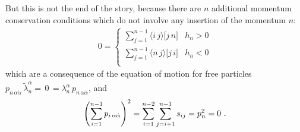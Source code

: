 \documentclass[aps,prd,nofootinbib,twocolumn,10pt]{revtex4-2}
\newcommand{\agl}[2]{\langle#1\, #2 \rangle}
\newcommand{\sqr}[2]{\lbrack #1\, #2 \rbrack}
\newcommand{\tlambda}{\widetilde{\lambda}}
\begin{document}
But this is not the end of the story, because there are $n$ additional momentum conservation conditions which do not involve any insertion of the momentum $n$:
\begin{align}
\label{eq::momcons2}
    0 = 
    \begin{cases}
        \sum\limits_{j=1}^{n-1} \agl{i}{j} \sqr{j}{n} &  h_n>0\\[.5em]
        \sum\limits_{j=1}^{n-1} \agl{n}{j} \sqr{j}{i} &  h_n<0\\
    \end{cases}
\end{align}
which are a consequence of the equation of motion for free particles $p_{n\, \alpha \dot{\alpha}}\, \tlambda_{n}^{\dot{\alpha}}=\, 0 \, = \lambda^{\alpha}_n\, p_{n\, \alpha \dot{\alpha}}$, and
\begin{equation}
\label{eq::momcons1}
	\left(\sum_{i = 1}^{n-1} p_{i \, \alpha \dot{\alpha}}\right)^2 =\sum_{i=1}^{n-2} \sum_{j=i+1}^{n-1} s_{i j} = p_n^2 = 0\ .\\
\end{equation}
\end{document}
